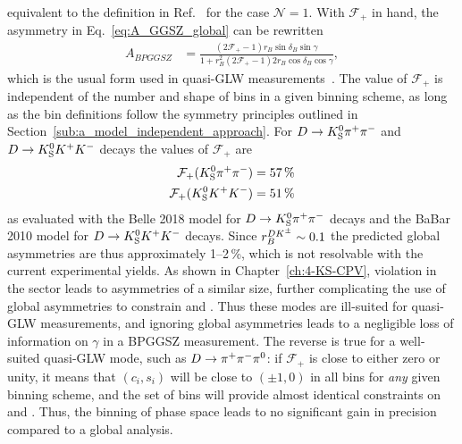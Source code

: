 equivalent to the definition in Ref.~\cite{nayakFirstDeterminationCP2015} for the case $\mathcal N=1$.  With $\mathcal F_+$ in hand, the asymmetry in Eq.~\eqref{eq:A_GGSZ_global} can be rewritten
\begin{align}
    A_{BPGGSZ} &= \frac{(2\mathcal F_+-1) r_B \sin \delta_B \sin \gamma}{1 + r_B^2 (2\mathcal F_+-1) 2 r_B \cos \delta_B \cos \gamma},
\end{align}
which is the usual form used in quasi-GLW measurements~\cite{nayakFirstDeterminationCP2015,maldeFirstDeterminationCP2015}. The value of $\mathcal F_+$ is independent of the number and shape of bins in a given binning scheme, as long as the bin definitions follow the symmetry principles outlined in Section~\ref{sub:a_model_independent_approach}. 
For ${{D}\rightarrow{\ensuremath{{K}^0_{\mathrm{S}}}}{\ensuremath{{\pi}^+}}{\ensuremath{{\pi}^-}}}$ and ${D}\rightarrow{\ensuremath{{K}^0_{\mathrm{S}}}}{\ensuremath{{K}^+}}{\ensuremath{{K}^-}}$ decays the values of $\mathcal F_+$ are
\begin{align}
\begin{split}
    \mathcal F_+({{K}^0_{\mathrm{S}}}{{\pi}^+}{{\pi}^-}) = 57\,\% \\
    \mathcal F_+({{K}^0_{\mathrm{S}}}{{K}^+}{{K}^-}) = 51\,\%
\end{split}
\end{align}
as evaluated with the Belle 2018 model for ${{D}\rightarrow{\ensuremath{{K}^0_{\mathrm{S}}}}{\ensuremath{{\pi}^+}}{\ensuremath{{\pi}^-}}}$ decays and the BaBar 2010 model for ${D}\rightarrow{\ensuremath{{K}^0_{\mathrm{S}}}}{\ensuremath{{K}^+}}{\ensuremath{{K}^-}}$ decays. Since $r_B^{{{D}{{K}^\pm}}}\sim 0.1$ the predicted global asymmetries are thus approximately 1--2\,\%, which is not resolvable with the current experimental yields. As shown in Chapter~\ref{ch:4-KS-CPV}, \CP violation in the \KS sector leads to asymmetries of a similar size, further complicating the use of global asymmetries to constrain \xpm and \ypm. Thus these modes are ill-suited for quasi-GLW measurements, and ignoring global asymmetries leads to a negligible loss of information on $\gamma$ in a BPGGSZ measurement. The reverse is true for a well-suited quasi-GLW mode, such as ${D}\rightarrow{\ensuremath{{\pi}^+}}{\ensuremath{{\pi}^-}}{\ensuremath{{\pi}^0}}$: if $\mathcal F_+$ is close to either zero or unity, it means that $(c_i, s_i)$ will be close to $(\pm1, 0)$ in all bins for \emph{any} given binning scheme, and the set of bins will provide almost identical constraints on \xpm and \ypm. Thus, the binning of phase space leads to no significant gain in precision compared to a global analysis.


